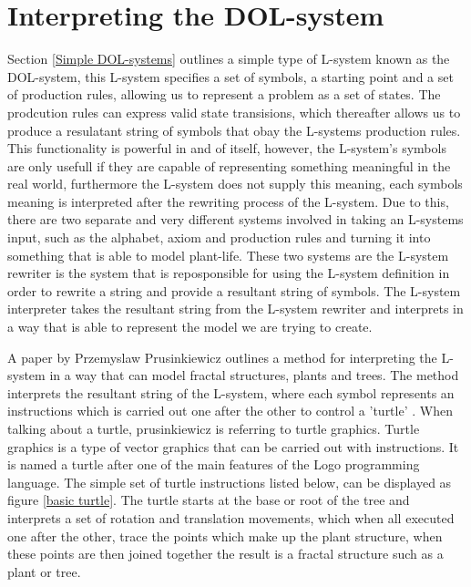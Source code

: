 \section{Interpreting the DOL-system} \label{Interpreting DOL-system}

\begin{flushleft}

Section \ref{Simple DOL-systems} outlines a simple type of L-system known as the DOL-system, this L-system specifies a set of symbols, a starting point and a set of production rules, allowing us to represent a problem as a set of states. The prodcution rules can express valid state transisions, which thereafter allows us to produce a resulatant string of symbols that obay the L-systems production rules. This functionality is powerful in and of itself, however, the L-system's symbols are only usefull if they are capable of representing something meaningful in the real world, furthermore the L-system does not supply this meaning, each symbols meaning is interpreted after the rewriting process of the L-system. Due to this, there are two separate and very different systems involved in taking an L-systems input, such as the alphabet, axiom and production rules and turning it into something that is able to model plant-life. These two systems are the L-system rewriter is the system that is reposponsible for using the L-system definition in order to rewrite a string and provide a resultant string of symbols. The L-system interpreter takes the resultant string from the L-system rewriter and interprets in a way that is able to represent the model we are trying to create. \\

\vspace{5mm}

A paper by Przemyslaw Prusinkiewicz outlines a method for interpreting the L-system in a way that can model fractal structures, plants and trees. The method interprets the resultant string of the L-system, where each symbol represents an instructions which is carried out one after the other to control a 'turtle' \cite{prusinkiewicz1986graphical}. When talking about a turtle, prusinkiewicz is referring to turtle graphics. Turtle graphics is a type of vector graphics that can be carried out with instructions. It is named a turtle after one of the main features of the Logo programming language. The simple set of turtle instructions listed below, can be displayed as figure \ref{basic turtle}. The turtle starts at the base or root of the tree and interprets a set of rotation and translation movements, which when all executed one after the other, trace the points which make up the plant structure, when these points are then joined together the result is a fractal structure such as a plant or tree.\\


\end{flushleft}
